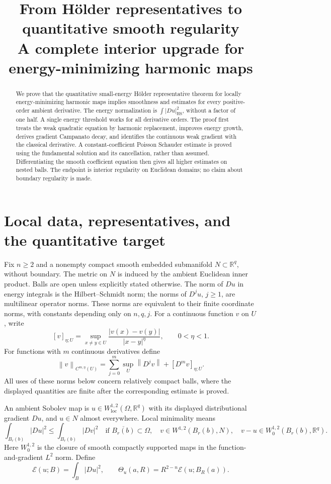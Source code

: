 \documentclass[11pt,a4paper]{article}
\title{From H\"older representatives to quantitative smooth regularity\\
\large A complete interior upgrade for energy-minimizing harmonic maps}
\author{}
\date{}
\numberwithin{equation}{section}
\theoremstyle{definition}
\theoremstyle{remark}
\newcommand{\R}{\mathbb R}
\newcommand{\norm}[1]{\left\lVert#1\right\rVert}
\newcommand{\E}{\mathcal E}
\newcommand{\Th}{\Theta}
\begin{document}
\maketitle

\begin{abstract}
We prove that the quantitative small-energy H\"older representative theorem
for locally energy-minimizing harmonic maps implies smoothness and estimates
for every positive-order ambient derivative. The energy normalization is
\(\int |Du|_{\mathrm{HS}}^2\), without a factor of one half. A single energy
threshold works for all derivative orders. The proof first treats the weak
quadratic equation by harmonic replacement, improves energy growth, derives
gradient Campanato decay, and identifies the continuous weak gradient with
the classical derivative. A constant-coefficient Poisson Schauder estimate is
proved using the fundamental solution and its cancellation, rather than
assumed. Differentiating the smooth coefficient equation then gives all
higher estimates on nested balls. The endpoint is interior regularity on
Euclidean domains; no claim about boundary regularity is made.
\end{abstract}

\section{Local data, representatives, and the quantitative target}
\label{sec:local}

Fix \(n\ge2\) and a nonempty compact smooth embedded submanifold
\(N\subset\R^q\), without boundary. The metric on \(N\) is induced by the
ambient Euclidean inner product. Balls are open unless explicitly stated
otherwise. The norm of \(Du\) in energy integrals is the Hilbert--Schmidt
norm; the norms of \(D^j u\), \(j\ge1\), are multilinear operator norms.
These norms are equivalent to their finite coordinate norms, with constants
depending only on \(n,q,j\). For a continuous function \(v\) on \(U\), write
\[
 [v]_{\eta;U}=\sup_{x\ne y\in U}
 \frac{|v(x)-v(y)|}{|x-y|^\eta},\qquad 0<\eta<1.
\]
For functions with \(m\) continuous derivatives define
\[
 \norm{v}_{C^{m,\eta}(U)}
 =\sum_{j=0}^m\sup_U\norm{D^jv}+[D^mv]_{\eta;U}.
\]
All uses of these norms below concern relatively compact balls, where the
displayed quantities are finite after the corresponding estimate is proved.

An ambient Sobolev map is \(u\in W^{1,2}_{\mathrm{loc}}(\Omega,\R^q)\)
with its displayed distributional gradient \(Du\), and \(u\in N\) almost
everywhere. Local minimality means
\[
 \int_{B_r(b)}|Du|^2\le\int_{B_r(b)}|Dv|^2
 \quad\text{if }\overline{B_r(b)}\subset\Omega,
 \quad v\in W^{1,2}(B_r(b),N),\quad v-u\in W^{1,2}_0(B_r(b),\R^q).
\]
Here \(W^{1,2}_0\) is the closure of smooth compactly supported maps in
the function-and-gradient \(L^2\) norm. Define
\[
 \E(u;B)=\int_B |Du|^2,\qquad
 \Th_u(a,R)=R^{2-n}\E(u;B_R(a)).
\]
\end{document}
